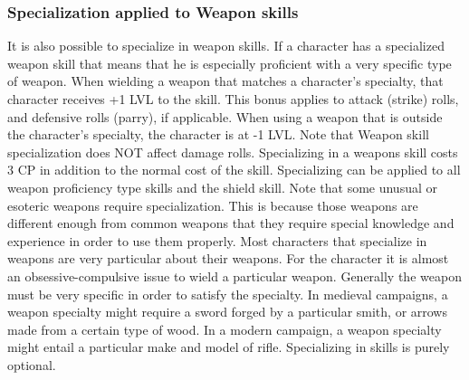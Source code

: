 \documentclass[twoside]{book}
\begin{document}
\subsubsection{Specialization applied to Weapon skills}
     It is also possible to specialize in weapon
                 skills. If a character has a specialized weapon skill
                 that means that he is especially proficient with a very
                 specific type of weapon. When wielding a weapon that
                 matches a character's specialty, that character
                 receives +1 LVL to the skill. This bonus applies to
                 attack (strike) rolls, and defensive rolls (parry), if
                 applicable. When using a weapon that is outside the
                 character's specialty, the character is at -1 LVL.
                 Note that Weapon skill specialization does NOT affect
                 damage rolls.  Specializing in a weapons skill costs 3 CP in
                 addition to the normal cost of the skill. Specializing
                 can be applied to all weapon proficiency type skills and
                 the shield skill. 
   Note that some unusual or esoteric weapons require
                 specialization. This is because those weapons are
                 different enough from common weapons that they require
                 special knowledge and experience in order to use them
                 properly.  Most characters that specialize in weapons are
                 very particular about their weapons. For the character
                 it is almost an obsessive-compulsive issue to wield a
                 particular weapon. Generally the weapon must be very
                 specific in order to satisfy the specialty. In medieval
                 campaigns, a weapon specialty might require a sword
                 forged by a particular smith, or arrows made from a
                 certain type of wood. In a modern campaign, a weapon
                 specialty might entail a particular make and model of
                 rifle.  Specializing in skills is purely optional. 
\end{document}
